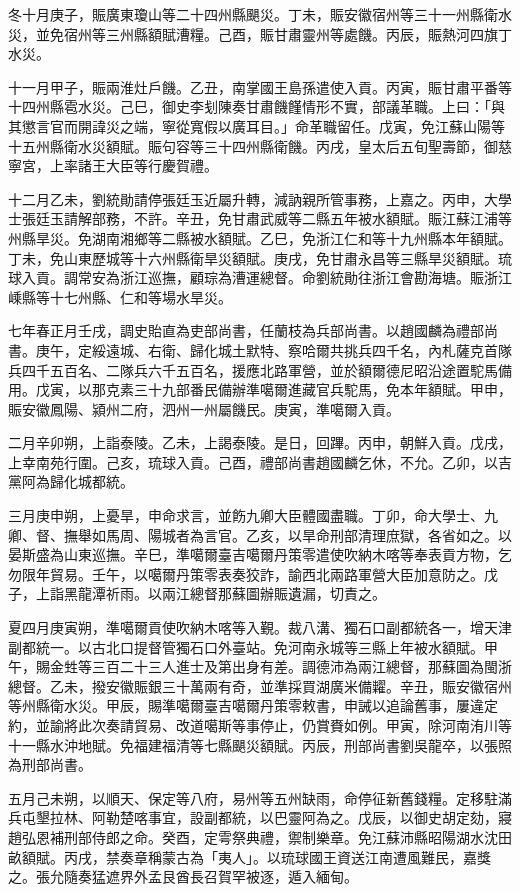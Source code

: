 \begin{pinyinscope}
冬十月庚子，賑廣東瓊山等二十四州縣颶災。丁未，賑安徽宿州等三十一州縣衛水災，並免宿州等三州縣額賦漕糧。己酉，賑甘肅靈州等處饑。丙辰，賑熱河四旗丁水災。

十一月甲子，賑兩淮灶戶饑。乙丑，南掌國王島孫遣使入貢。丙寅，賑甘肅平番等十四州縣雹水災。己巳，御史李刬陳奏甘肅饑饉情形不實，部議革職。上曰：「與其懲言官而開諱災之端，寧從寬假以廣耳目。」命革職留任。戊寅，免江蘇山陽等十五州縣衛水災額賦。賑句容等三十四州縣衛饑。丙戌，皇太后五旬聖壽節，御慈寧宮，上率諸王大臣等行慶賀禮。

十二月乙未，劉統勛請停張廷玉近屬升轉，減訥親所管事務，上嘉之。丙申，大學士張廷玉請解部務，不許。辛丑，免甘肅武威等二縣五年被水額賦。賑江蘇江浦等州縣旱災。免湖南湘鄉等二縣被水額賦。乙巳，免浙江仁和等十九州縣本年額賦。丁未，免山東歷城等十六州縣衛旱災額賦。庚戌，免甘肅永昌等三縣旱災額賦。琉球入貢。調常安為浙江巡撫，顧琮為漕運總督。命劉統勛往浙江會勘海塘。賑浙江嵊縣等十七州縣、仁和等場水旱災。

七年春正月壬戌，調史貽直為吏部尚書，任蘭枝為兵部尚書。以趙國麟為禮部尚書。庚午，定綏遠城、右衛、歸化城土默特、察哈爾共挑兵四千名，內札薩克首隊兵四千五百名、二隊兵六千五百名，援應北路軍營，並於額爾德尼昭沿途置駝馬備用。戊寅，以那克素三十九部番民備辦準噶爾進藏官兵駝馬，免本年額賦。甲申，賑安徽鳳陽、潁州二府，泗州一州屬饑民。庚寅，準噶爾入貢。

二月辛卯朔，上詣泰陵。乙未，上謁泰陵。是日，回蹕。丙申，朝鮮入貢。戊戌，上幸南苑行圍。己亥，琉球入貢。己酉，禮部尚書趙國麟乞休，不允。乙卯，以吉黨阿為歸化城都統。

三月庚申朔，上憂旱，申命求言，並飭九卿大臣體國盡職。丁卯，命大學士、九卿、督、撫舉如馬周、陽城者為言官。乙亥，以旱命刑部清理庶獄，各省如之。以晏斯盛為山東巡撫。辛巳，準噶爾臺吉噶爾丹策零遣使吹納木喀等奉表貢方物，乞勿限年貿易。壬午，以噶爾丹策零表奏狡詐，諭西北兩路軍營大臣加意防之。戊子，上詣黑龍潭祈雨。以兩江總督那蘇圖辦賑遺漏，切責之。

夏四月庚寅朔，準噶爾貢使吹納木喀等入覲。裁八溝、獨石口副都統各一，增天津副都統一。以古北口提督管獨石口外臺站。免河南永城等三縣上年被水額賦。甲午，賜金甡等三百二十三人進士及第出身有差。調德沛為兩江總督，那蘇圖為閩浙總督。乙未，撥安徽賑銀三十萬兩有奇，並準採買湖廣米備糶。辛丑，賑安徽宿州等州縣衛水災。甲辰，賜準噶爾臺吉噶爾丹策零敕書，申誡以追論舊事，屢違定約，並諭將此次奏請貿易、改道噶斯等事停止，仍賞賚如例。甲寅，除河南洧川等十一縣水沖地賦。免福建福清等七縣颶災額賦。丙辰，刑部尚書劉吳龍卒，以張照為刑部尚書。

五月己未朔，以順天、保定等八府，易州等五州缺雨，命停征新舊錢糧。定移駐滿兵屯墾拉林、阿勒楚喀事宜，設副都統，以巴靈阿為之。戊辰，以御史胡定劾，寢趙弘恩補刑部侍郎之命。癸酉，定雩祭典禮，禦制樂章。免江蘇沛縣昭陽湖水沈田畝額賦。丙戌，禁奏章稱蒙古為「夷人」。以琉球國王資送江南遭風難民，嘉獎之。張允隨奏猛遮界外孟艮酋長召賀罕被逐，遁入緬甸。


\end{pinyinscope}
